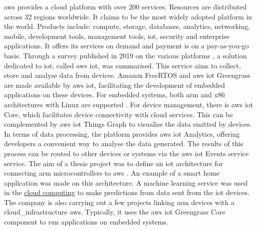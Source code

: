 \gls{aws} \cite{amazon_web_services} provides a \gls{cloud} platform with over 200 services. Resources are distributed across 32 regions worldwide. It claims to be the most widely adopted platform in the world. Products include: compute, storage, databases, analytics, networking, mobile, development tools, management tools, \acrshort{iot}, security and enterprise applications. It offers its services on demand and payment is on a pay-as-you-go basis. Through a survey published in 2019 on the various platforms \cite{survey_iot_platform_comparison}, a solution dedicated to \acrshort{iot}, called \gls{aws} \acrshort{iot}, was summarised. This service aims to collect, store and analyse data from devices. Amazon FreeRTOS and \gls{aws} \acrshort{iot} Greengrass are made available by \gls{aws} \acrshort{iot}, facilitating the development of embedded applications on these devices. For embedded systems, both \gls{arm} and x86 architectures with Linux are supported \cite{fog_computing_platforms_comparison}. For device management, there is \gls{aws} \acrshort{iot} Core, which facilitates device connectivity with \gls{cloud} services. This can be complemented by \gls{aws} \acrshort{iot} Things Graph to visualise the data emitted by devices. In terms of data processing, the platform provides \gls{aws} \acrshort{iot} Analytics, offering developers a convenient way to analyse the data generated. The results of this process can be routed to other devices or systems via the \gls{aws} \acrshort{iot} Events service \cite{survey_iot_platform_comparison} service. The aim of a thesis project was to define an \acrshort{iot} architecture for connecting \gls{arm} microcontrollers to \gls{aws} \cite{aws_arm_architecture_iot}. An example of a smart home application was made on this architecture. A machine learning service was used in the \hyperref[subsec:cloudcomputing]{cloud computing} to make predictions from data sent from the \acrshort{iot} devices. The company  is also carrying out a few projects linking \gls{arm} devices with a \gls{cloud_infrastructure} \gls{aws}. Typically, it uses the \gls{aws} \acrshort{iot} Greengrass Core component to run applications on embedded systems.

